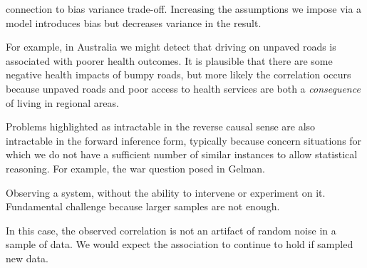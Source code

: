 connection to bias variance trade-off. Increasing the assumptions we impose via a model introduces bias but decreases variance in the result.


For example, in Australia we might detect that driving on unpaved roads is associated with poorer health outcomes. It is plausible that there are some negative health impacts of bumpy roads, but more likely the correlation occurs because unpaved roads and poor access to health services are both a \emph{consequence} of living in regional areas.


Problems highlighted as intractable in the reverse causal sense are also intractable in the forward inference form, typically because concern situations for which we do not have a sufficient number of similar instances to allow statistical reasoning. For example, the war question posed in Gelman. 


Observing a system, without the ability to intervene or experiment on it. Fundamental challenge because larger samples are not enough. 


In this case, the observed correlation is not an artifact of random noise in a sample of data. We would expect the association to continue to hold if sampled new data. 


